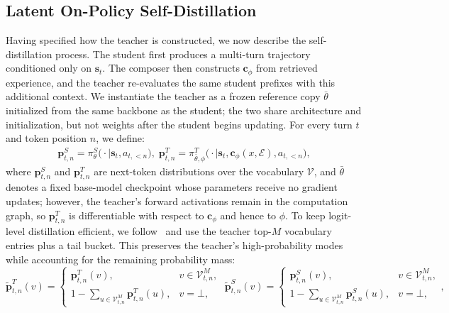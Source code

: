 \documentclass{article} %
\begin{document}
\vspace{-0.4em}
\subsection{Latent On-Policy Self-Distillation}
\vspace{-0.4em}

Having specified how the teacher is constructed, we now describe the self-distillation process. The student first produces a multi-turn trajectory conditioned only on $\boldsymbol{s}_t$. The composer then constructs $\boldsymbol{c}_{\phi}$ from retrieved experience, and the teacher re-evaluates the same student prefixes with this additional context. We instantiate the teacher as a frozen reference copy $\bar{\theta}$ initialized from the same backbone as the student; the two share architecture and initialization, but not weights after the student begins updating. For every turn $t$ and token position $n$, we define:
\begin{equation}
\begin{aligned}
\boldsymbol{p}^{S}_{t,n}=\pi_{\theta}^{S}\big(\cdot\mid \boldsymbol{s}_t,a_{t,<n}\big),\;
\boldsymbol{p}^{T}_{t,n}=\pi_{\bar{\theta},\phi}^{T}\big(\cdot\mid \boldsymbol{s}_t,\boldsymbol{c}_{\phi}(x,\mathcal{E}),a_{t,<n}\big),
\end{aligned}
\label{eq:multi-turn-teacher-student}
\end{equation}
where $\boldsymbol{p}^{S}_{t,n}$ and $\boldsymbol{p}^{T}_{t,n}$ are next-token distributions over the vocabulary $\mathcal{V}$, and $\bar{\theta}$ denotes a fixed base-model checkpoint whose parameters receive no gradient updates; however, the teacher's forward activations remain in the computation graph, so $\boldsymbol{p}^{T}_{t,n}$ is differentiable with respect to $\boldsymbol{c}_{\phi}$ and hence to $\phi$.
To keep logit-level distillation efficient, we follow~\citep{zhao2026selfdistilledreasoneronpolicyselfdistillation} and use the teacher top-$M$ vocabulary entries plus a tail bucket. This preserves the teacher's high-probability modes while accounting for the remaining probability mass:
\begin{equation}
\tilde{\boldsymbol{p}}^{T}_{t,n}(v)=
\begin{cases}
\boldsymbol{p}^{T}_{t,n}(v), & v\in \mathcal{V}_{t,n}^{M},\\
1-\sum_{u\in\mathcal{V}_{t,n}^{M}}\boldsymbol{p}^{T}_{t,n}(u), & v=\bot,
\end{cases}
\;
\tilde{\boldsymbol{p}}^{S}_{t,n}(v)=
\begin{cases}
\boldsymbol{p}^{S}_{t,n}(v), & v\in \mathcal{V}_{t,n}^{M},\\
1-\sum_{u\in\mathcal{V}_{t,n}^{M}}\boldsymbol{p}^{S}_{t,n}(u), & v=\bot,
\end{cases},
\label{eq:topk-tail}
\end{equation}
\end{document}
